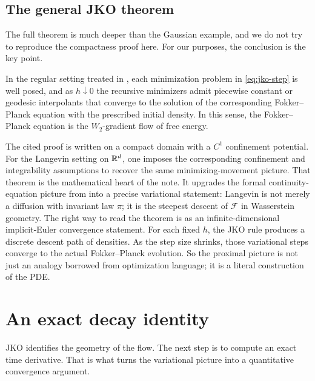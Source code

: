 \documentclass[11pt]{article}
\begin{document}
\subsection{The general JKO theorem}
\label{subsec:jko-general-theorem}

The full theorem is much deeper than the Gaussian example, and we do not try to reproduce the compactness proof here.
For our purposes, the conclusion is the key point.

\begin{theorem}
\label{thm:jko-general}
In the regular setting treated in \citet[\S4.5, Eq.~(4.13), Prop.~4.14, Prop.~4.19, pp.~37--42]{santambrogio_2016_gradient_flows_overview}, each minimization problem in \eqref{eq:jko-step} is well posed, and as $h\downarrow 0$ the recursive minimizers admit piecewise constant or geodesic interpolants that converge to the solution of the corresponding Fokker--Planck equation with the prescribed initial density.
In this sense, the Fokker--Planck equation is the $W_2$-gradient flow of free energy.
\end{theorem}

The cited proof is written on a compact domain with a $C^1$ confinement potential.
For the Langevin setting on $\mathbb{R}^d$, one imposes the corresponding confinement and integrability assumptions to recover the same minimizing-movement picture.
That theorem is the mathematical heart of the note.
It upgrades the formal continuity-equation picture from  into a precise variational statement: Langevin is not merely a diffusion with invariant law $\pi$; it is the steepest descent of $\mathcal{F}$ in Wasserstein geometry.
The right way to read the theorem is as an infinite-dimensional implicit-Euler convergence statement.
For each fixed $h$, the JKO rule produces a discrete descent path of densities.
As the step size shrinks, those variational steps converge to the actual Fokker--Planck evolution.
So the proximal picture is not just an analogy borrowed from optimization language; it is a literal construction of the PDE.

\section{An exact decay identity}
\label{sec:entropy-dissipation}

JKO identifies the geometry of the flow.
The next step is to compute an exact time derivative.
That is what turns the variational picture into a quantitative convergence argument.
\end{document}
